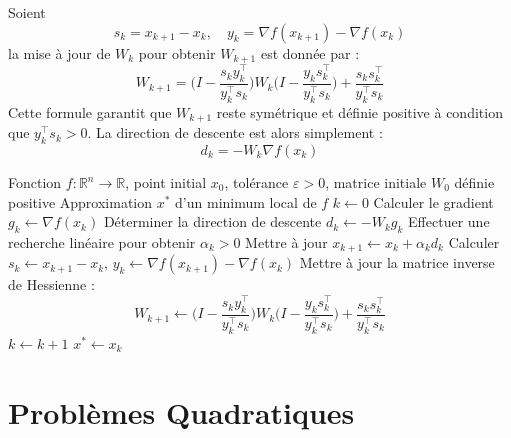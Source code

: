 \begin{proposition}
    Soient 
        \[ s_k = x_{k+1} - x_k, \quad y_k = \nabla f(x_{k+1}) - \nabla f(x_k) \] 
    la mise à jour de $W_k$ pour obtenir $W_{k+1}$ est donnée par :
        \begin{equation}
            \boxed{ W_{k+1} = \Big(I - \frac{s_k y_k^\top}{y_k^\top s_k}\Big) W_k \Big(I - \frac{y_k s_k^\top}{y_k^\top s_k}\Big) + \frac{s_k s_k^\top}{y_k^\top s_k}}
        \end{equation}
    Cette formule garantit que $W_{k+1}$ reste symétrique et définie positive à condition que $y_k^\top s_k > 0$.
    La direction de descente est alors simplement :
        \begin{equation}
            \boxed{d_k = - W_k \nabla f(x_k)}
        \end{equation}
\end{proposition}

\begin{algorithm}[H]
\caption{Algorithme quasi-Newton (BFGS)}
\begin{algorithmic}[1]
\Require Fonction $f : \mathbb{R}^n \to \mathbb{R}$, point initial $x_0$, tolérance $\varepsilon > 0$, matrice initiale $W_0$ définie positive
\Ensure Approximation $x^*$ d’un minimum local de $f$
\State $k \gets 0$
    \State Calculer le gradient $g_k \gets \nabla f(x_k)$
    \State Déterminer la direction de descente $d_k \gets - W_k g_k$
    \State Effectuer une recherche linéaire pour obtenir $\alpha_k > 0$
    \State Mettre à jour $x_{k+1} \gets x_k + \alpha_k d_k$
    \State Calculer $s_k \gets x_{k+1} - x_k$, $y_k \gets \nabla f(x_{k+1}) - \nabla f(x_k)$
    \State Mettre à jour la matrice inverse de Hessienne :
    \[
        W_{k+1} \gets \Big(I - \frac{s_k y_k^\top}{y_k^\top s_k}\Big) W_k \Big(I - \frac{y_k s_k^\top}{y_k^\top s_k}\Big) + \frac{s_k s_k^\top}{y_k^\top s_k}
    \]
    \State $k \gets k + 1$
\EndWhile
\State \Return $x^* \gets x_k$
\end{algorithmic}
\end{algorithm}




\section{Problèmes Quadratiques}

